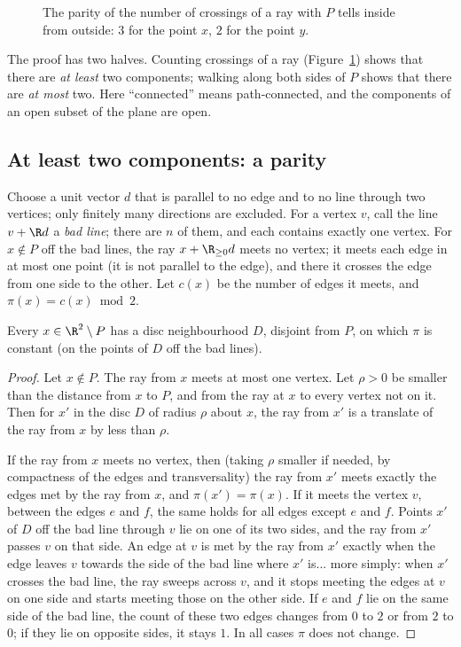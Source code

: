 \begin{figure}[ht]\centering{}
\caption{The parity of the number of crossings of a ray with $P$ tells inside from outside: $3$ for the point $x$, $2$ for the point $y$.}\label{fig:polygon}
\end{figure}

The proof has two halves. Counting crossings of a ray (Figure~\ref{fig:polygon}) shows that there are \emph{at least} two components; walking along both sides of $P$ shows that there are \emph{at most} two.
Here ``connected'' means path-connected, and the components of an open subset of the plane are open.

\subsection*{At least two components: a parity}

Choose a unit vector $d$ that is parallel to no edge and to no line through two vertices; only finitely many directions are excluded. For a vertex $v$, call the line $v+\R d$ a \emph{bad line}; there are $n$ of them,
and each contains exactly one vertex. For $x\notin P$ off the bad lines, the ray $x+\R_{\ge0}d$ meets no vertex; it meets each edge in at most one point (it is not parallel to the edge), and there it crosses the
edge from one side to the other. Let $c(x)$ be the number of edges it meets, and $\pi(x)=c(x)\bmod2$.

\begin{lemma}\label{lem:parity}
Every $x\in\R^2\setminus P$ has a disc neighbourhood $D$, disjoint from $P$, on which $\pi$ is constant (on the points of $D$ off the bad lines).
\end{lemma}

\begin{proof}
Let $x\notin P$. The ray from $x$ meets at most one vertex. Let $\rho>0$ be smaller than the distance from $x$ to $P$, and from the ray at $x$ to every vertex not on it. Then for $x'$ in the disc $D$ of
radius $\rho$ about $x$, the ray from $x'$ is a translate of the ray from $x$ by less than $\rho$.

If the ray from $x$ meets no vertex, then (taking $\rho$ smaller if needed, by compactness of the edges and transversality) the ray from $x'$ meets exactly the edges met by the ray from $x$, and $\pi(x')=\pi(x)$. If it meets the vertex $v$,
between the edges $e$ and $f$, the same holds for all edges except $e$ and $f$. Points $x'$ of $D$ off the bad line through $v$ lie on one of its two sides, and the ray from $x'$ passes $v$ on that side. An edge at $v$ is met by
the ray from $x'$ exactly when the edge leaves $v$ towards the side of the bad line where $x'$ is... more simply: when $x'$ crosses the bad line, the ray sweeps across $v$, and it stops meeting the edges at $v$ on one side and starts
meeting those on the other side. If $e$ and $f$ lie on the same side of the bad line, the count of these two edges changes from $0$ to $2$ or from $2$ to $0$; if they lie on opposite sides, it stays $1$. In all cases $\pi$ does not change.
\end{proof}

